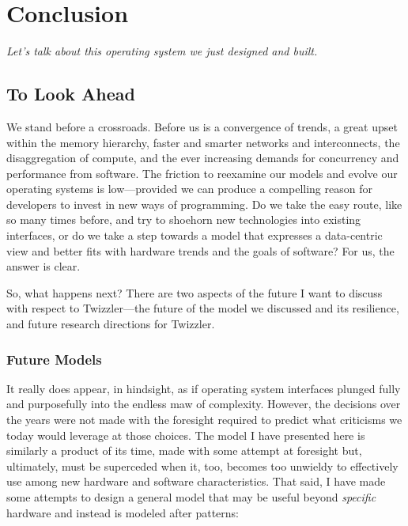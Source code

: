 
\chapter{Conclusion}\label{ch:conclusion}

\emph{Let's talk about this operating system we just designed and built.}

\section{To Look Ahead}



We stand before a crossroads. Before us is a convergence of trends, a great upset within the memory hierarchy, faster
and smarter networks and interconnects, the disaggregation of compute, and the
ever increasing demands for concurrency and performance from software. The friction to reexamine our models and evolve
our operating systems is low---provided we can produce a compelling reason for developers to invest in new ways of programming.
Do we take the easy route, like so many times before, and try to shoehorn new technologies into existing interfaces, or
do we take a step towards a model that expresses a data-centric view and better fits with hardware trends and the goals
of software? For us, the answer is clear.

So, what happens next? There are two aspects of the future I want to discuss with respect to Twizzler---the future of
the model we discussed and its resilience, and future research directions for Twizzler.

\subsection{Future Models}

It really does appear, in hindsight, as if operating system interfaces plunged fully and purposefully into the endless maw of
complexity. However, the decisions over the years were not made with the foresight required to predict what criticisms
we today would leverage at those choices. The model I have presented here is similarly a product of its time, made with
some attempt at foresight but, ultimately, must be superceded when it, too, becomes too unwieldy to effectively use
among new hardware and software characteristics. That said, I have made some attempts to design a general model that
may be useful beyond \emph{specific} hardware and instead is modeled after patterns:

